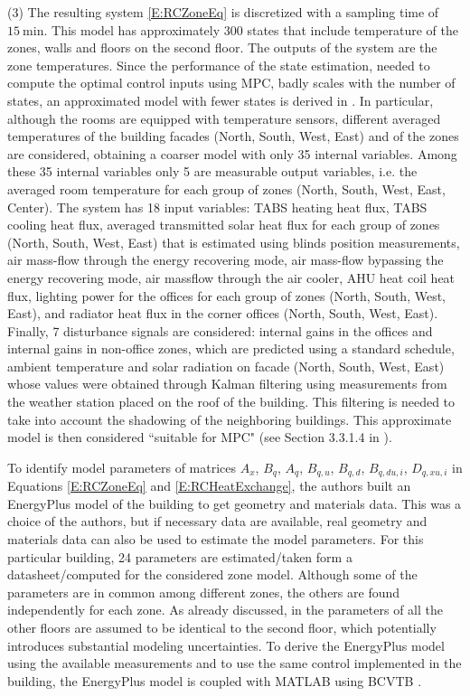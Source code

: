 \textcolor[rgb]{0,0,1}{(3) The resulting system \eqref{E:RCZoneEq} is discretized with a sampling time of $15\ \mathrm{min}$. This model has approximately 300 states that include temperature of the zones, walls and floors on the second floor. The outputs of the system are the zone temperatures. Since the performance of the state estimation, needed to compute the optimal control inputs using MPC, badly scales with the number of states, an approximated model with fewer states is derived in \cite{SturzeneggerTR}. In particular, although the rooms are equipped with temperature sensors, different averaged temperatures of the building facades (North, South, West, East) and of the zones are considered, obtaining a coarser model with only 35 internal variables. Among these 35 internal variables only 5 are measurable output variables, i.e. the averaged room temperature for each group of zones (North, South, West, East, Center). The system has 18 input variables: TABS heating heat flux, TABS cooling heat flux, averaged transmitted solar heat flux for each group of zones (North, South, West, East) that is estimated using blinds position measurements, air mass-flow through the energy recovering mode, air mass-flow bypassing the energy recovering mode, air massflow through the air cooler, AHU heat coil heat flux, lighting power for the offices for each group of zones (North, South, West, East), and radiator heat flux in the corner offices (North, South, West, East). Finally, 7 disturbance signals are considered: internal gains in the offices and internal gains in non-office zones, which are predicted using a standard schedule, ambient temperature and solar radiation on facade (North, South, West, East) whose values were obtained through Kalman filtering using measurements from the weather station placed on the roof of the building. This filtering is needed to take into account the shadowing of the neighboring buildings. This approximate model is then considered ``suitable for MPC" (see Section 3.3.1.4 in \cite{SturzeneggerTR}).}
	
\textcolor[rgb]{0,0,1}{To identify model parameters of matrices $A_x$, $B_q$, $A_q$, $B_{q,u}$, $B_{q,d}$, $B_{q,du,i}$, $D_{q,xu,i}$ in Equations \eqref{E:RCZoneEq} and \eqref{E:RCHeatExchange}, the authors built an EnergyPlus model of the building to get geometry and materials data. This was a choice of the authors, but if necessary data are available, real geometry and materials data can also be used to estimate the model parameters. For this particular building, 24 parameters are estimated/taken form a datasheet/computed for the considered zone model. Although some of the parameters are in common among different zones, the others are found independently for each zone. As already discussed, in \cite{SturzeneggerTR} the parameters of all the other floors are assumed to be identical to the second floor, which potentially introduces substantial modeling uncertainties. To derive the EnergyPlus model using the available measurements and to use the same control implemented in the building, the EnergyPlus model is coupled with MATLAB using BCVTB \cite{Wetter2015}.}


